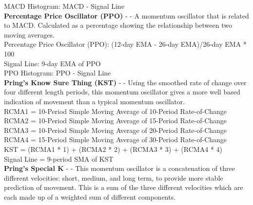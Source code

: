 \documentclass[conference]{IEEEtran}
\begin{document}
\noindent
MACD Histogram: MACD - Signal Line \\

\noindent
\textbf{Percentage Price Oscillator (PPO)} - \cite{Murphy1999} - A momentum oscillator that is related to MACD. Calculated as a percentage showing the relationship between two moving averages. \\

\noindent
Percentage Price Oscillator (PPO): {(12-day EMA - 26-day EMA)/26-day EMA} * 100 \\
Signal Line: 9-day EMA of PPO \\
PPO Histogram: PPO - Signal Line \\

\noindent
\textbf{Pring's Know Sure Thing (KST)} - \cite{Pring2002} - Using the smoothed rate of change over four different length periods, this momentum oscillator gives a more well based indication of movement than a typical momentum oscillator. \\

\noindent
RCMA1 = 10-Period Simple Moving Average of 10-Period Rate-of-Change \\
RCMA2 = 10-Period Simple Moving Average of 15-Period Rate-of-Change \\
RCMA3 = 10-Period Simple Moving Average of 20-Period Rate-of-Change \\
RCMA4 = 15-Period Simple Moving Average of 30-Period Rate-of-Change \\
KST = (RCMA1 * 1) + (RCMA2 * 2) + (RCMA3 * 3) + (RCMA4 * 4) \\
Signal Line = 9-period SMA of KST \\

\noindent
\textbf{Pring's Special K} - \cite{Pring2002} - This momentum oscillator is a concatenation of three different velocities: short, medium, and long term, to provide more stable prediction of movement. This is a sum of the three different velocities which are each made up of a weighted sum of different components.\\
\end{document}
